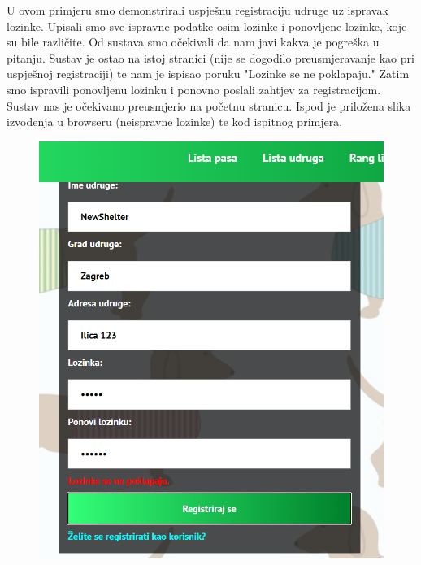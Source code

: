 		 U ovom primjeru smo demonstrirali uspješnu registraciju udruge uz ispravak lozinke. Upisali smo sve ispravne podatke osim lozinke i ponovljene lozinke, koje su bile različite. Od sustava smo očekivali da nam javi kakva je pogreška u pitanju. Sustav je ostao na istoj stranici (nije se dogodilo preusmjeravanje kao pri uspješnoj registraciji) te nam je ispisao poruku "Lozinke se ne poklapaju." Zatim smo ispravili ponovljenu lozinku i ponovno poslali zahtjev za registracijom. Sustav nas je očekivano preusmjerio na početnu stranicu. Ispod je priložena slika izvođenja u browseru (neispravne lozinke) te kod ispitnog primjera. 
			 
			  \begin{figure}[H]
			 	\includegraphics[scale=0.75]{slike/PasswordError.PNG}
			 	\centering
			 \end{figure}
